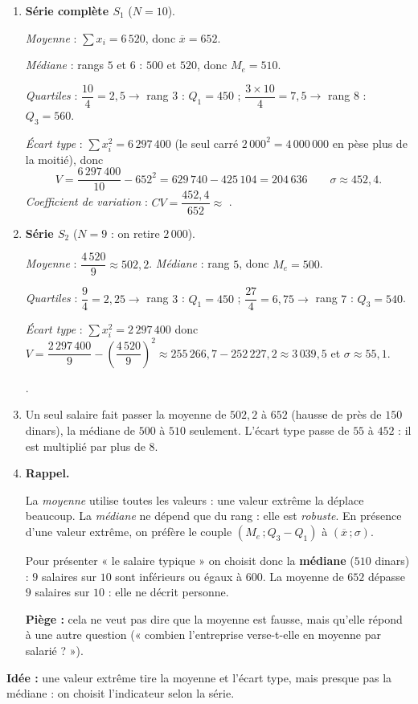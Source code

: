 \begin{enumerate}
  \item \textbf{Série complète $S_1$} ($N=10$).

  \emph{Moyenne} : $\sum x_i=6\,520$, donc $\overline{x}=652$.

  \emph{Médiane} : rangs $5$ et $6$ : $500$ et $520$, donc $M_e=510$.

  \emph{Quartiles} : $\dfrac{10}4=2{,}5\to$ rang $3$ : $Q_1=450$ ; $\dfrac{3\times10}4=7{,}5\to$ rang $8$ : $Q_3=560$.

  \emph{Écart type} : $\sum x_i^2=6\,297\,400$ (le seul carré $2\,000^2=4\,000\,000$ en pèse plus de la moitié), donc
  $$V=\frac{6\,297\,400}{10}-652^2=629\,740-425\,104=204\,636\qquad\sigma\approx452{,}4.$$
  \emph{Coefficient de variation} : $CV=\dfrac{452{,}4}{652}\approx$ .
  \item \textbf{Série $S_2$} ($N=9$ : on retire $2\,000$).

  \emph{Moyenne} : $\dfrac{4\,520}9\approx502{,}2$. \emph{Médiane} : rang $5$, donc $M_e=500$.

  \emph{Quartiles} : $\dfrac94=2{,}25\to$ rang $3$ : $Q_1=450$ ; $\dfrac{27}4=6{,}75\to$ rang $7$ : $Q_3=540$.

  \emph{Écart type} : $\sum x_i^2=2\,297\,400$ donc $V=\dfrac{2\,297\,400}{9}-\left(\dfrac{4\,520}9\right)^2\approx255\,266{,}7-252\,227{,}2\approx3\,039{,}5$ et $\sigma\approx55{,}1$.

  .
  \item Un seul salaire fait passer la moyenne de $502{,}2$ à $652$ (hausse de près de $150$ dinars), la médiane de $500$ à $510$ seulement. L'écart type passe de $55$ à $452$ : il est multiplié par plus de $8$.
  \item \textbf{Rappel.}\par
  \begin{prop}
  La \emph{moyenne} utilise toutes les valeurs : une valeur extrême la déplace beaucoup. La \emph{médiane} ne dépend que du rang : elle est \emph{robuste}. En présence d'une valeur extrême, on préfère le couple $(M_e\,;Q_3-Q_1)$ à $(\overline{x}\,;\sigma)$.
  \end{prop}
  Pour présenter « le salaire typique » on choisit donc la \textbf{médiane} ($510$ dinars) : $9$ salaires sur $10$ sont inférieurs ou égaux à $600$. La moyenne de $652$ dépasse $9$ salaires sur $10$ : elle ne décrit personne.

  \textbf{Piège :} cela ne veut pas dire que la moyenne est fausse, mais qu'elle répond à une autre question (« combien l'entreprise verse-t-elle en moyenne par salarié ? »).
\end{enumerate}

\textbf{Idée :} une valeur extrême tire la moyenne et l'écart type, mais presque pas la médiane : on choisit l'indicateur selon la série.
